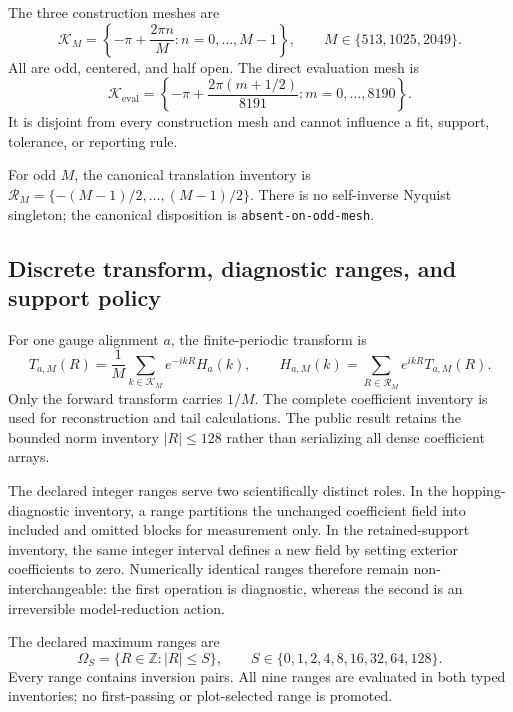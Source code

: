 \documentclass[11pt]{article}
\begin{document}
The three construction meshes are
\begin{equation}
 \mathcal K_M=\left\{-\pi+\frac{2\pi n}{M}:n=0,\ldots,M-1\right\},
 \qquad M\in\{513,1025,2049\}.
 \label{eq:construction-mesh}
\end{equation}
All are odd, centered, and half open. The direct evaluation mesh is
\begin{equation}
 \mathcal K_{\mathrm{eval}}=
 \left\{-\pi+\frac{2\pi(m+1/2)}{8191}:m=0,\ldots,8190\right\}.
 \label{eq:evaluation-mesh}
\end{equation}
It is disjoint from every construction mesh and cannot influence a fit, support,
tolerance, or reporting rule.

For odd $M$, the canonical translation inventory is
$\mathcal R_M=\{-(M-1)/2,\ldots,(M-1)/2\}$. There is no self-inverse Nyquist singleton;
the canonical disposition is \texttt{absent-on-odd-mesh}.

\subsection{Discrete transform, diagnostic ranges, and support policy}

For one gauge alignment $a$, the finite-periodic transform is
\begin{equation}
 T_{a,M}(R)=\frac1M\sum_{k\in\mathcal K_M}e^{-ikR}H_a(k),
 \qquad
 H_{a,M}(k)=\sum_{R\in\mathcal R_M}e^{ikR}T_{a,M}(R).
 \label{eq:discrete-transform}
\end{equation}
Only the forward transform carries $1/M$. The complete coefficient inventory is used for
reconstruction and tail calculations. The public result retains the bounded norm
inventory $|R|\leq128$ rather than serializing all dense coefficient arrays.

The declared integer ranges serve two scientifically distinct roles. In the
hopping-diagnostic inventory, a range partitions the unchanged coefficient field into
included and omitted blocks for measurement only. In the retained-support inventory,
the same integer interval defines a new field by setting exterior coefficients to zero.
Numerically identical ranges therefore remain non-interchangeable: the first operation
is diagnostic, whereas the second is an irreversible model-reduction action.

The declared maximum ranges are
\begin{equation}
 \Omega_S=\{R\in\mathbb Z:|R|\leq S\},
 \qquad S\in\{0,1,2,4,8,16,32,64,128\}.
 \label{eq:supports}
\end{equation}
Every range contains inversion pairs. All nine ranges are evaluated in both typed
inventories; no first-passing or plot-selected range is promoted.
\end{document}
